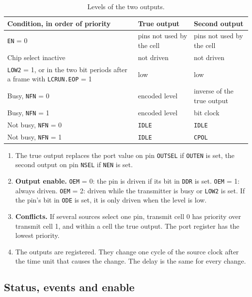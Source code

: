 \documentclass[10pt,a4paper]{article}
\newcommand{\reg}[1]{\texttt{#1}}
\begin{document}
\begin{table}[H]
\centering\small
\begin{tabular}{@{}>{\raggedright\arraybackslash}p{72mm}ll@{}}
\toprule
Condition, in order of priority & True output & Second output \\
\midrule
\reg{EN} = 0 & pins not used by the cell & pins not used by the cell \\
Chip select inactive & not driven & not driven \\
\reg{LOW2} = 1, or in the two bit periods after a frame with \reg{LCRUN.EOP} = 1 & low & low \\
Busy, \reg{NFN} = 0 & encoded level & inverse of the true output \\
Busy, \reg{NFN} = 1 & encoded level & bit clock \\
Not busy, \reg{NFN} = 0 & \reg{IDLE} & \reg{IDLE} \\
Not busy, \reg{NFN} = 1 & \reg{IDLE} & \reg{CPOL} \\
\bottomrule
\end{tabular}
\caption{Levels of the two outputs.}
\end{table}

\begin{enumerate}[label=\textbf{O\arabic*},leftmargin=2.6em]
\item The true output replaces the port value on pin \reg{OUTSEL} if \reg{OUTEN} is set, the second output on pin
\reg{NSEL} if \reg{NEN} is set.
\item \textbf{Output enable.} \reg{OEM} = 0: the pin is driven if its bit in \reg{DDR} is set. \reg{OEM} = 1: always
driven. \reg{OEM} = 2: driven while the transmitter is busy or \reg{LOW2} is set. If the pin's bit in \reg{ODE}
is set, it is only driven when the level is low.
\item \textbf{Conflicts.} If several sources select one pin, transmit cell 0 has priority over transmit cell 1, and within a cell the true output. The port register has the lowest priority.
\item The outputs are registered. They change one cycle of the source clock after the time unit that causes the
change. The delay is the same for every change.
\end{enumerate}

\subsection{Status, events and enable}
\end{document}
